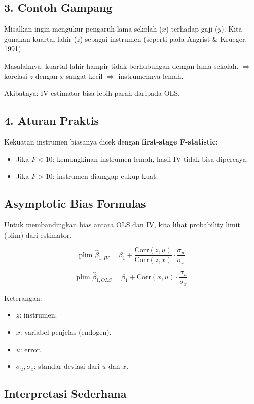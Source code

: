 \documentclass[]{article}
\begin{document}
\subsection*{3. Contoh Gampang}
Misalkan ingin mengukur pengaruh lama sekolah ($x$) terhadap gaji ($y$).  
Kita gunakan kuartal lahir ($z$) sebagai instrumen (seperti pada Angrist \& Krueger, 1991).  

Masalahnya: kuartal lahir hampir tidak berhubungan dengan lama sekolah.  
$\Rightarrow$ korelasi $z$ dengan $x$ sangat kecil $\Rightarrow$ instrumennya lemah.  

Akibatnya: IV estimator bisa lebih parah daripada OLS.

\subsection*{4. Aturan Praktis}
Kekuatan instrumen biasanya dicek dengan \textbf{first-stage F-statistic}:
\begin{itemize}
    \item Jika $F < 10$: kemungkinan instrumen lemah, hasil IV tidak bisa dipercaya.
    \item Jika $F > 10$: instrumen dianggap cukup kuat.
\end{itemize}
\subsection*{Asymptotic Bias Formulas}

Untuk membandingkan bias antara OLS dan IV, kita lihat probability limit (plim) dari estimator.

\[
\text{plim } \hat{\beta}_{1,IV} 
= \beta_1 + \frac{\text{Corr}(z,u)}{\text{Corr}(z,x)} \cdot \frac{\sigma_u}{\sigma_x}
\]

\[
\text{plim } \hat{\beta}_{1,OLS} 
= \beta_1 + \text{Corr}(x,u) \cdot \frac{\sigma_u}{\sigma_x}
\]

\noindent
Keterangan:
\begin{itemize}
  \item $z$: instrumen.
  \item $x$: variabel penjelas (endogen).
  \item $u$: error.
  \item $\sigma_u, \sigma_x$: standar deviasi dari $u$ dan $x$.
\end{itemize}

\subsection*{Interpretasi Sederhana}
\end{document}

